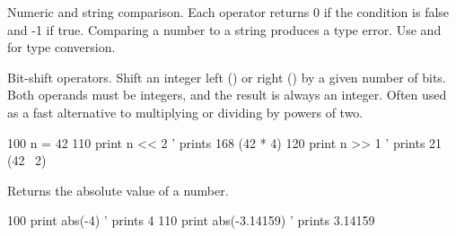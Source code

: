 \begin{entry}
Numeric and string comparison. Each operator returns 0 if the condition is false and -1 if true. Comparing a number to a string produces a type error. Use  and  for type conversion.

\end{entry}

\begin{entry}
Bit-shift operators. Shift an integer left (\code{\textless{}\textless{}}) or right (\code{\textgreater{}\textgreater{}}) by a given number of bits. Both operands must be integers, and the result is always an integer. Often used as a fast alternative to multiplying or dividing by powers of two.

\begin{lstexample}
100 n = 42
110 print n << 2  ' prints 168 (42 * 4)
120 print n >> 1  ' prints 21 (42 \ 2)
\end{lstexample}
\end{entry}

\begin{entry}
Returns the absolute value of a number.

\begin{lstexample}
100 print abs(-4)        ' prints 4
110 print abs(-3.14159)  ' prints 3.14159
\end{lstexample}
\end{entry}

